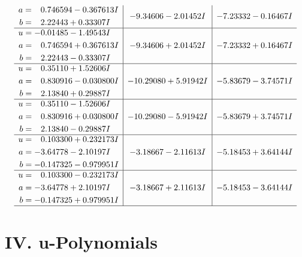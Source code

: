 \documentclass[1p]{elsarticle_modified}
\theoremstyle{definition}
\begin{document}
$$\begin{array}{c|c|c}
\begin{aligned}
a &= \phantom{-}0.746594 - 0.367613 I \\
b &= \phantom{-}2.22443 + 0.33307 I\end{aligned}
 & -9.34606 - 2.01452 I & -7.23332 - 0.16467 I \\ \hline\begin{aligned}
u &= -0.01485 - 1.49543 I \\
a &= \phantom{-}0.746594 + 0.367613 I \\
b &= \phantom{-}2.22443 - 0.33307 I\end{aligned}
 & -9.34606 + 2.01452 I & -7.23332 + 0.16467 I \\ \hline\begin{aligned}
u &= \phantom{-}0.35110 + 1.52606 I \\
a &= \phantom{-}0.830916 - 0.030800 I \\
b &= \phantom{-}2.13840 + 0.29887 I\end{aligned}
 & -10.29080 + 5.91942 I & -5.83679 - 3.74571 I \\ \hline\begin{aligned}
u &= \phantom{-}0.35110 - 1.52606 I \\
a &= \phantom{-}0.830916 + 0.030800 I \\
b &= \phantom{-}2.13840 - 0.29887 I\end{aligned}
 & -10.29080 - 5.91942 I & -5.83679 + 3.74571 I \\ \hline\begin{aligned}
u &= \phantom{-}0.103300 + 0.232173 I \\
a &= -3.64778 - 2.10197 I \\
b &= -0.147325 - 0.979951 I\end{aligned}
 & -3.18667 - 2.11613 I & -5.18453 + 3.64144 I \\ \hline\begin{aligned}
u &= \phantom{-}0.103300 - 0.232173 I \\
a &= -3.64778 + 2.10197 I \\
b &= -0.147325 + 0.979951 I\end{aligned}
 & -3.18667 + 2.11613 I & -5.18453 - 3.64144 I\\
 \hline 
 \end{array}$$\newpage
\newpage\renewcommand{\arraystretch}{1}
\centering \section*{ IV. u-Polynomials}
\end{document}
